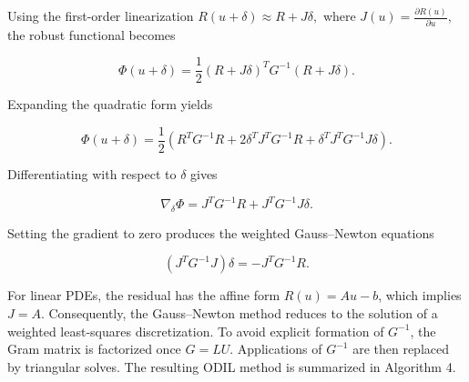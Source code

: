 \documentclass[review]{elsarticle}
\begin{document}
Using the first-order linearization
$
R(u+\delta)
\approx
R + J\delta,
$
where
$
J(u)
=
\frac{\partial R(u)}{\partial u},
$
the robust functional becomes

\begin{equation}
\Phi(u+\delta)
=
\frac12
(R+J\delta)^T
G^{-1}
(R+J\delta).
\end{equation}

Expanding the quadratic form yields

\begin{equation}
\Phi(u+\delta)
=
\frac12
\left(
R^T G^{-1} R
+
2\delta^T J^T G^{-1} R
+
\delta^T J^T G^{-1} J \delta
\right).
\end{equation}

Differentiating with respect to $\delta$ gives

\begin{equation}
\nabla_\delta \Phi
=
J^T G^{-1} R
+
J^T G^{-1} J \delta.
\end{equation}

Setting the gradient to zero produces the weighted Gauss--Newton equations

\begin{equation}
(J^T G^{-1} J)\delta
=
-
J^T G^{-1} R.
\label{eq:GN_ODIL}
\end{equation}

For linear PDEs, the residual has the affine form $R(u)=Au-b$, 
which implies $J=A.$ Consequently, the Gauss--Newton method reduces to the solution of a weighted least-squares discretization.
To avoid explicit formation of $G^{-1}$, the Gram matrix is factorized once $
G = LU$.
Applications of $G^{-1}$ are then replaced by triangular solves.
The resulting ODIL method is summarized in Algorithm 4.
\end{document}
